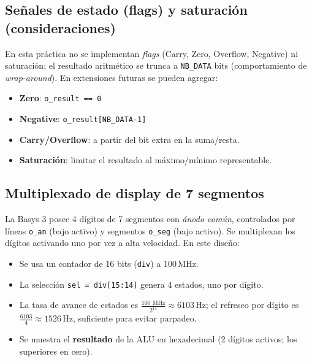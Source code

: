 \subsection{Señales de estado (flags) y saturación (consideraciones)}
En esta práctica no se implementan \textit{flags} (Carry, Zero, Overflow, Negative) ni saturación; el resultado aritmético se trunca a \texttt{NB\_DATA} bits (comportamiento de \textit{wrap-around}). En extensiones futuras se pueden agregar:
\begin{itemize}
    \item \textbf{Zero}: \texttt{o\_result == 0}
    \item \textbf{Negative}: \texttt{o\_result[NB\_DATA-1]}
    \item \textbf{Carry/Overflow}: a partir del bit extra en la suma/resta.
    \item \textbf{Saturación}: limitar el resultado al máximo/mínimo representable.
\end{itemize}

\subsection{Multiplexado de display de 7 segmentos}
La Basys 3 posee 4 dígitos de 7 segmentos con \textit{ánodo común}, controlados por líneas \texttt{o\_an} (bajo activo) y segmentos \texttt{o\_seg} (bajo activo). Se multiplexan los dígitos activando uno por vez a alta velocidad. 
En este diseño:
\begin{itemize}
    \item Se usa un contador de 16 bits (\texttt{div}) a 100\,MHz.
    \item La selección \texttt{sel = div[15:14]} genera 4 estados, uno por dígito.
    \item La tasa de avance de estados es $\frac{100\text{ MHz}}{2^{14}} \approx 6103$\,Hz; el refresco por dígito es $\frac{6103}{4} \approx 1526$\,Hz, suficiente para evitar parpadeo.
    \item Se muestra el \textbf{resultado} de la ALU en hexadecimal (2 dígitos activos; los superiores en cero).
\end{itemize}

